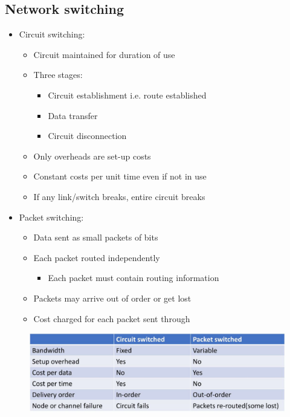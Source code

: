 \documentclass[conference]{IEEEtran}
\begin{document}
\subsection{Network switching}

\begin{itemize}
    \item Circuit switching: 
    \begin{itemize}
        \item Circuit maintained for duration of use 
        \item Three stages:
        \begin{itemize}
            \item Circuit establishment i.e. route established 
            \item Data transfer 
            \item Circuit disconnection
        \end{itemize}
        \item Only overheads are set-up costs
        \item Constant costs per unit time even if not in use 
        \item If any link/switch breaks, entire circuit breaks 
    \end{itemize}

    \item Packet switching: 
    \begin{itemize}
        \item Data sent as small packets of bits 
        \item Each packet routed independently
        \begin{itemize}
            \item Each packet must contain routing information
        \end{itemize}
        \item Packets may arrive out of order or get lost 
        \item Cost charged for each packet sent through 
    \end{itemize}
\end{itemize}
\begin{figure} [h!]
    \centering
    \includegraphics[scale=0.4]{Ex34.JPG}
\end{figure}
\end{document}
